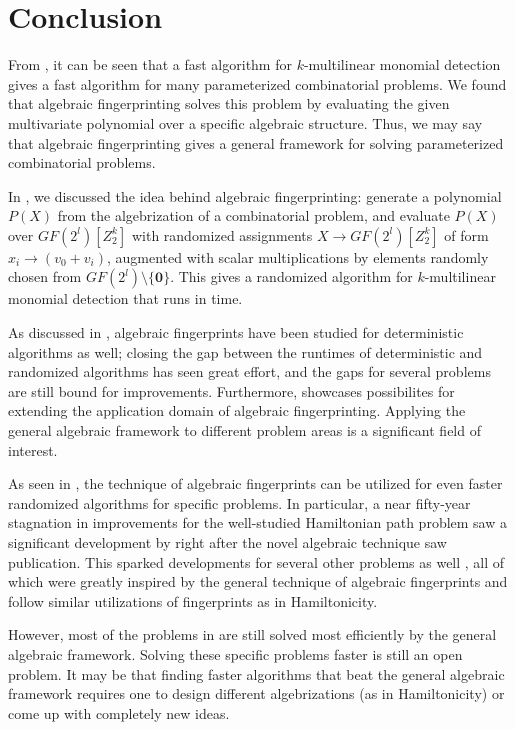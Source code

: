 \section{Conclusion}
\label{sect:conclusion}

From , 
it can be seen  
that a fast algorithm for $k$-multilinear monomial detection gives a 
fast algorithm for many parameterized combinatorial problems. 
We found that algebraic fingerprinting solves this problem by 
evaluating the given multivariate polynomial over a specific algebraic structure. 
Thus, we 
may say that algebraic fingerprinting gives a general framework for solving 
parameterized combinatorial problems. 

In , we discussed the idea behind 
algebraic fingerprinting: generate a polynomial $P(X)$ from the algebrization of 
a combinatorial problem, and evaluate $P(X)$ over $GF(2^{l})[Z_2^k]$ with 
randomized assignments $X \to GF(2^{l})[Z_2^k]$ of form 
$x_i \to (v_0 + v_i)$, augmented with scalar multiplications 
by elements randomly chosen from $GF(2^{l}) \setminus \{\mathbf{0}\}$. 
This gives a randomized algorithm for 
$k$-multilinear monomial detection that runs in  time.

As discussed in , algebraic fingerprints 
have been studied for deterministic algorithms as well; closing 
the gap between the runtimes of deterministic and randomized algorithms 
has seen great effort, and the gaps for several problems are still bound for improvements.
Furthermore,  showcases possibilites for extending the 
application domain of algebraic fingerprinting. Applying the general algebraic framework 
to different problem areas is a significant field of interest.

As seen in , 
the technique of algebraic fingerprints can be utilized for even 
faster randomized algorithms for specific problems. 
In particular, a near fifty-year stagnation 
in improvements for the well-studied Hamiltonian path problem saw 
a significant development by \citeauthor{Björklund14} right after 
the novel algebraic technique \cite{Koutis08} saw publication. 
This sparked developments for several other 
problems as well \cite{Björklund17}, all of which were greatly inspired by 
the general technique of algebraic fingerprints and 
follow similar utilizations of fingerprints as in Hamiltonicity.

However, most of the problems in  are still 
solved most efficiently by the general algebraic framework. Solving these 
specific problems faster is still an open problem. 
It may be that 
finding faster algorithms that beat the general algebraic framework requires 
one to design different algebrizations (as in Hamiltonicity) 
or come up with completely new ideas.